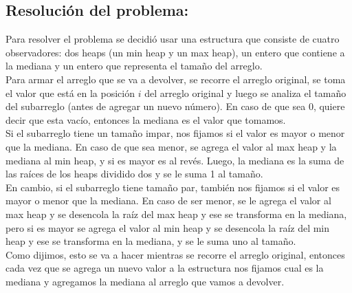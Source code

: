 \documentclass[10pt, a4paper]{article}
\begin{document}
		\subsection{Resoluci\'on del problema:}
		Para resolver el problema se decidi\'o usar una estructura que consiste de cuatro observadores: dos heaps (un min heap y un max heap), un entero que contiene a la mediana y un entero que representa el tamaño del arreglo.
		\\ Para armar el arreglo que se va a devolver, se recorre el arreglo original, se toma el valor que est\'a en la posici\'on $i$ del arreglo original y luego se analiza el tama\~no del subarreglo (antes de agregar un nuevo n\'umero). En caso de que sea 0, quiere decir que esta vac\'io, entonces la mediana es el valor que tomamos.
		\\Si el subarreglo tiene un tama\~no impar, nos fijamos si el valor es mayor o menor que la mediana. En caso de que sea menor, se agrega el valor al max heap y la mediana al min heap, y si es mayor es al rev\'es. Luego, la mediana es la suma de las ra\'ices de los heaps dividido dos y se le suma 1 al tama\~no.
		\\En cambio, si el subarreglo tiene tama\~no par, tambi\'en nos fijamos si el valor es mayor o menor que la mediana. En caso de ser menor, se le agrega el valor al max heap y se desencola la ra\'iz del max heap y ese se transforma en la mediana, pero si es mayor se agrega el valor al min heap y se desencola la ra\'iz del min heap y ese se transforma en la mediana, y se le suma uno al tama\~no.
		\\Como dijimos, esto se va a hacer mientras se recorre el arreglo original, entonces cada vez que se agrega un nuevo valor a la estructura nos fijamos cual es la mediana y agregamos la mediana al arreglo que vamos a devolver.
\end{document}
